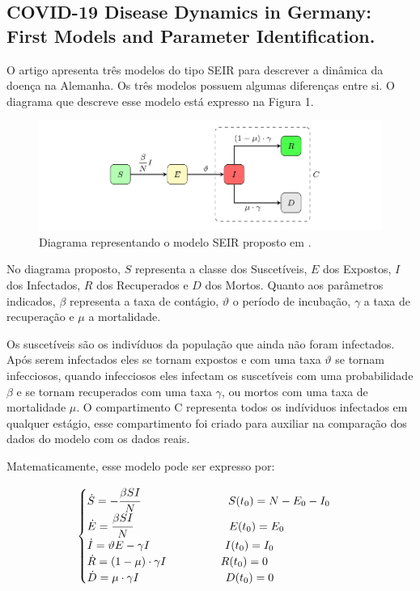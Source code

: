 \documentclass[12pt]{article}
\begin{document}
\subsection{COVID-19 Disease Dynamics in Germany: First Models and Parameter Identification.}

\indent O artigo \cite{goetz2020covid} apresenta três modelos do tipo SEIR para descrever a dinâmica da doença na Alemanha. Os três modelos possuem algumas diferenças entre si. O diagrama que descreve esse modelo está expresso na Figura 1.
\begin{figure}[h]
\begin{center}
    \includegraphics[scale = 0.6]{figTomas.png}
    \caption{Diagrama representando o modelo SEIR proposto em \cite{goetz2020covid}.}
\end{center}
\end{figure}

No diagrama proposto, $S$ representa a classe dos Suscetíveis, $E$ dos Expostos, $I$ dos Infectados, $R$ dos Recuperados e $D$ dos Mortos. Quanto aos parâmetros indicados, $\beta$ representa a taxa de contágio, $\vartheta$ o período de incubação, $\gamma$ a taxa de recuperação e $\mu$ a mortalidade. 

Os suscetíveis são os indivíduos da população que ainda não foram infectados. Após serem infectados eles se tornam expostos e com uma taxa $\vartheta$ se tornam infecciosos, quando infecciosos eles infectam os suscetíveis com uma probabilidade $\beta$ e se tornam recuperados com uma taxa $\gamma$, ou mortos com uma taxa de mortalidade $\mu$.
O compartimento C representa todos os indíviduos infectados em qualquer estágio, esse compartimento foi criado para auxiliar na comparação dos dados do modelo com os dados reais. 

\noindent Matematicamente, esse modelo pode ser expresso por:
\begin{center}
$$
\begin{cases}
\dot S = -\cfrac{\beta S I}{N} \hspace{2.75cm} S(t_0)= N - E_0 - I_0\\
\dot E = \cfrac{\beta S I}{N} \hspace{3.0cm} E(t_0) = E_0\\
\dot I = \vartheta E - \gamma I \hspace{2.35cm} I(t_0) = I_0\\
\dot R = (1- \mu) \cdot \gamma I\hspace{1.7cm} R(t_0) = 0 \\
\dot D = \mu \cdot \gamma I \hspace{2.7cm}  D(t_0) = 0
\end{cases}
$$
\end{center}
\end{document}
